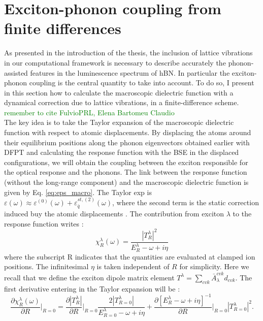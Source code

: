 %
\section{Exciton-phonon coupling from finite differences}
As presented in the introduction of the thesis, the inclusion of lattice vibrations in our computational framework is necessary to describe accurately the phonon-assisted features in the luminescence spectrum of hBN. In particular the exciton-phonon coupling is the central quantity to take into account. To do so, I present in this section how to calculate the macroscopic dielectric function with a dynamical correction due to lattice vibrations, in a finite-difference scheme. \textcolor{green}{remember to cite FulvioPRL, Elena Bartomeu Claudio}\\
The key idea is to take the Taylor expansion of the macroscopic dielectric function with respect to atomic displacements. By displacing the atoms around their equilibrium positions along the phonon eigenvectors obtained earlier with \acrshort{DFPT} and calculating the response function with the \acrshort{BSE} in the displaced configurations, we will obtain the coupling between the exciton responsible for the optical response and the phonons. The link between the response function (without the long-range component) and the macroscopic dielectric function is given by Eq. \eqref{eq:eps_macro}. 
The Taylor exp is $\varepsilon (\omega)\approx \varepsilon^{(0)}(\omega) + \varepsilon^{st,(2)}_{\bar{q}}(\omega)$, where the second term is the static correction induced buy the atomic displacements \cite{zacharias2016one}. 
The contribution from exciton $\lambda$ to the response function  writes :
\begin{equation}
	\chi^\lambda_R(\omega) = \frac{|T^\lambda_R|^2}{E^\lambda_R - \omega + i \eta}
\end{equation}
where the subscript R indicates that the quantities are evaluated at clamped ion positions. The infinitesimal $\eta$ is taken independent of $R$ for simplicity. Here we recall that we define the exciton dipole matrix element $T^\lambda = \sum_{cvk} \bar{A}_\lambda^{cvk} d_{cvk}$. The first derivative entering in the Taylor expansion will be :
\begin{equation}
	\frac{\partial \chi^\lambda_R(\omega)}{\partial R}\biggr|_{R=0} = \frac{\partial |T^\lambda_R|}{\partial R}\biggr|_{R=0} \frac{2|T^\lambda_{R=0}|}{E^\lambda_{R=0} - \omega + i\eta} + \frac{\partial \left[ E^\lambda_R - \omega + i\eta \right]^{-1}}{\partial R}\biggr|_{R=0} |T^\lambda_{R=0}|^2.
\end{equation}

